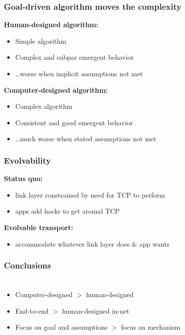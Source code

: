 \documentclass[svgnames]{beamer}
\begin{document}
\begin{frame}
\frametitle{Goal-driven algorithm \textbf{moves} the complexity}

\textbf{Human-designed algorithm:}

\begin{itemize}
\item Simple algorithm
\item Complex and subpar emergent behavior
\item \ldots worse when implicit assumptions not met
\end{itemize}

\textbf{Computer-designed algorithm:}

\begin{itemize}
\item Complex algorithm
\item Consistent and good emergent behavior
\item \ldots much worse when stated assumptions not met
\end{itemize}

\end{frame}

\begin{frame}
\frametitle{Evolvability}

\textbf{Status quo:}

\begin{itemize}

\item link layer constrained by need for TCP to perform
\item apps add hacks to get around TCP

\end{itemize}

\textbf{Evolvable transport:}

\begin{itemize}

\item accommodate whatever link layer does \& app wants

\end{itemize}

\end{frame}

\begin{frame}
\frametitle{Conclusions}

\section{}

\begin{itemize}

\item Computer-designed $>$ human-designed

\item End-to-end $>$ human-designed in-net

\item Focus on goal and assumptions $>$ focus on mechanism

\end{itemize}

\end{frame}
\end{document}
